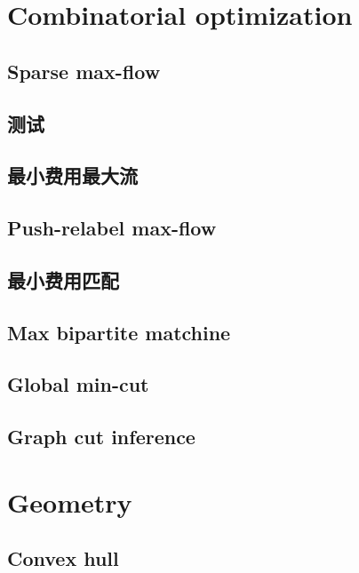 \chapter{Combinatorial optimization}
\section{Sparse max-flow}
\raggedbottom
\hrulefill
\section{测试}
\raggedbottom
\hrulefill
\section{最小费用最大流}
\raggedbottom
\hrulefill
\section{Push-relabel max-flow}
\raggedbottom
\hrulefill
\section{最小费用匹配}
\raggedbottom
\hrulefill
\section{Max bipartite matchine}
\raggedbottom
\hrulefill
\section{Global min-cut}
\raggedbottom
\hrulefill
\section{Graph cut inference}
\raggedbottom
\hrulefill

\chapter{Geometry}
\section{Convex hull}
\raggedbottom
\hrulefill
